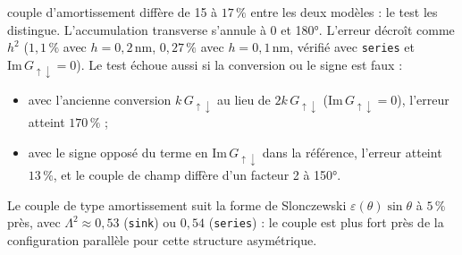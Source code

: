 \documentclass[11pt,a4paper]{article}
\begin{document}
couple d'amortissement diffère de 15 à $17\,\%$ entre les deux modèles :
le test les distingue. L'accumulation transverse s'annule à 0 et 180°.
L'erreur décroît comme $h^2$ ($1{,}1\,\%$ avec $h=0{,}2$\,nm,
$0{,}27\,\%$ avec $h=0{,}1$\,nm, vérifié avec \texttt{series} et
$\mathrm{Im}\,G_{\uparrow\downarrow}=0$). Le test échoue aussi si la
conversion ou le signe est faux :
\begin{itemize}
  \item avec l'ancienne conversion $k\,G_{\uparrow\downarrow}$ au lieu de
    $2k\,G_{\uparrow\downarrow}$ ($\mathrm{Im}\,G_{\uparrow\downarrow}=0$),
    l'erreur atteint $170\,\%$ ;
  \item avec le signe opposé du terme en $\mathrm{Im}\,G_{\uparrow\downarrow}$
    dans la référence, l'erreur atteint $13\,\%$, et le couple de champ
    diffère d'un facteur 2 à 150°.
\end{itemize}
Le couple de type amortissement suit la forme de Slonczewski
$\varepsilon(\theta)\sin\theta$ à $5\,\%$ près, avec
$\Lambda^2\approx0{,}53$ (\texttt{sink}) ou $0{,}54$ (\texttt{series}) : le
couple est plus fort près de la configuration parallèle pour cette
structure asymétrique.
\end{document}
